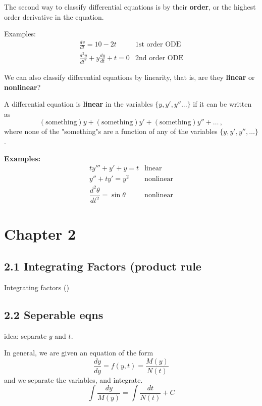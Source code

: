 \documentclass[a5paper]{article}
\theoremstyle{definition}%
\numberwithin{exercise}{section}
\theoremstyle{remark}%
\begin{document}
\noindent The second way to classify differential equations is by their \textbf{order}, or the highest order derivative in the equation. 

\begin{highlight}
Examples:
\[\begin{array}{ll}
\frac{dv}{dt}=10-2t & 1\text{st order ODE}\\
\frac{d^2y}{dt^2}+y\frac{dy}{dt}+t=0 & 2\text{nd order ODE}
\end{array}\]
\end{highlight}

\noindent We can also classify differential equations by linearity, that is, are they \textbf{linear} or \textbf{nonlinear}?

\pagebreak
\begin{highlight}
A differential equation is \textbf{linear} in the variables $\{y, y', y''...\}$ if it can be written as 
$$(\text{something})y+(\text{something})y'+(\text{something})y''+\dots \, , $$
where none of the "something"s are a function of any of the variables $\{y, y', y'', \ldots\}$. 
\end{highlight}

\textbf{Examples:}
\[\begin{array}{ll}
ty'''+y'+y=t & \text{linear}\\
y''+ty'=y^2 & \text{nonlinear}\\
\dfrac{d^2\theta}{dt^2}=\sin\theta & \text{nonlinear}

\end{array}\]


\section{Chapter 2}

\subsection{2.1 Integrating Factors (product rule}

Integrating factors ()

\subsection{2.2 Seperable eqns}

idea: separate $y$ and $t$. 

In general, we are given an equation of the form 
$$
\frac{dy}{dy}=f(y,t)=\frac{M(y)}{N(t)}$$
and we separate the variables, and integrate.
$$\int \frac{dy}{M(y)}=\int \frac{dt}{N(t)} +C$$
\end{document}
